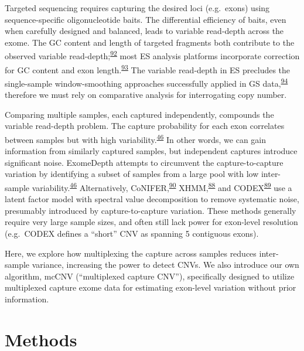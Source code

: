 \documentclass[11pt,letterpaper]{book}
\begin{document}
Targeted sequencing requires capturing the desired loci (e.g.~exons) using sequence-specific oligonucleotide baits.
The differential efficiency of baits, even when carefully designed and balanced, leads to variable read-depth across the exome.
The GC content and length of targeted fragments both contribute to the observed variable read-depth;\textsuperscript{\protect\hyperlink{ref-benjamini:2012aa}{92}} most ES analysis platforms incorporate correction for GC content and exon length.\textsuperscript{\protect\hyperlink{ref-kadalayil:2015aa}{93}}
The variable read-depth in ES precludes the single-sample window-smoothing approaches successfully applied in GS data,\textsuperscript{\protect\hyperlink{ref-chiang:2009aa}{94}} therefore we must rely on comparative analysis for interrogating copy number.

Comparing multiple samples, each captured independently, compounds the variable read-depth problem.
The capture probability for each exon correlates between samples but with high variability.\textsuperscript{\protect\hyperlink{ref-plagnol:2012aa}{46}}
In other words, we can gain information from similarly captured samples, but independent captures introduce significant noise.
ExomeDepth attempts to circumvent the capture-to-capture variation by identifying a subset of samples from a large pool with low inter-sample variability.\textsuperscript{\protect\hyperlink{ref-plagnol:2012aa}{46}}
Alternatively, CoNIFER,\textsuperscript{\protect\hyperlink{ref-krumm:2012aa}{90}} XHMM,\textsuperscript{\protect\hyperlink{ref-fromer:2012aa}{88}} and CODEX\textsuperscript{\protect\hyperlink{ref-jiang:2015aa}{89}} use a latent factor model with spectral value decomposition to remove systematic noise, presumably introduced by capture-to-capture variation.
These methods generally require very large sample sizes, and often still lack power for exon-level resolution (e.g.~CODEX defines a ``short'' CNV as spanning 5 contiguous exons).

Here, we explore how multiplexing the capture across samples reduces inter-sample variance, increasing the power to detect CNVs.
We also introduce our own algorithm, mcCNV (``multiplexed capture CNV''), specifically designed to utilize multiplexed capture exome data for estimating exon-level variation without prior information.

\hypertarget{methods}{%
\section{Methods}\label{methods}}
\end{document}
